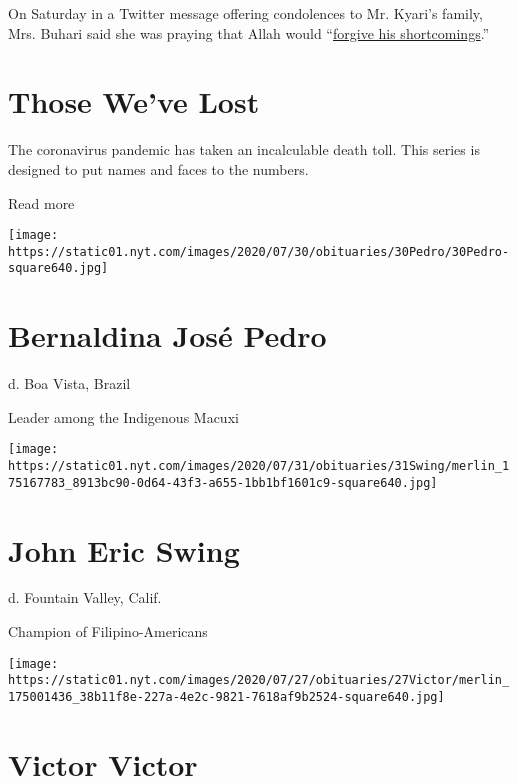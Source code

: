 On Saturday in a Twitter message offering condolences to Mr. Kyari's
family, Mrs. Buhari said she was praying that Allah would
``\href{https://twitter.com/aishambuhari/status/1251484410941255680}{forgive
his shortcomings}.''

\href{https://www.nytimes.com/interactive/2020/obituaries/people-died-coronavirus-obituaries.html?action=click\&pgtype=Article\&state=default\&region=BELOW_MAIN_CONTENT\&context=covid_obits_promo}{}

\hypertarget{those-weve-lost}{%
\section{Those We've Lost}\label{those-weve-lost}}

The coronavirus pandemic has taken an incalculable death toll. This
series is designed to put names and faces to the numbers.

Read more

\texttt{[image: https://static01.nyt.com/images/2020/07/30/obituaries/30Pedro/30Pedro-square640.jpg]}

\hypertarget{bernaldina-josuxe9-pedro}{%
\section{Bernaldina José Pedro}\label{bernaldina-josuxe9-pedro}}

d. Boa Vista, Brazil

Leader among the Indigenous Macuxi

\texttt{[image: https://static01.nyt.com/images/2020/07/31/obituaries/31Swing/merlin\_175167783\_8913bc90-0d64-43f3-a655-1bb1bf1601c9-square640.jpg]}

\hypertarget{john-eric-swing}{%
\section{John Eric Swing}\label{john-eric-swing}}

d. Fountain Valley, Calif.

Champion of Filipino-Americans

\texttt{[image: https://static01.nyt.com/images/2020/07/27/obituaries/27Victor/merlin\_175001436\_38b11f8e-227a-4e2c-9821-7618af9b2524-square640.jpg]}

\hypertarget{victor-victor}{%
\section{Victor Victor}\label{victor-victor}}

